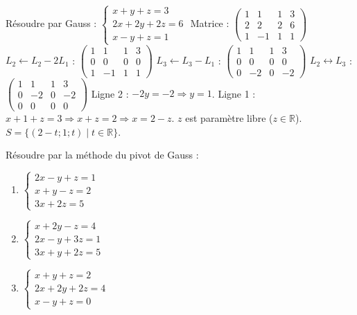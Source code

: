 \documentclass[11pt]{article}
\begin{document}
\begin{exoresolu}
Résoudre par Gauss :
$\begin{cases}
x + y + z = 3 \\
2x + 2y + 2z = 6 \\
x - y + z = 1
\end{cases}$
\tcblower
Matrice :
$\left( \begin{array}{ccc|c} 1 & 1 & 1 & 3 \\ 2 & 2 & 2 & 6 \\ 1 & -1 & 1 & 1 \end{array} \right)$
$L_2 \leftarrow L_2 - 2L_1$ : $\left( \begin{array}{ccc|c} 1 & 1 & 1 & 3 \\ 0 & 0 & 0 & 0 \\ 1 & -1 & 1 & 1 \end{array} \right)$
$L_3 \leftarrow L_3 - L_1$ : $\left( \begin{array}{ccc|c} 1 & 1 & 1 & 3 \\ 0 & 0 & 0 & 0 \\ 0 & -2 & 0 & -2 \end{array} \right)$
$L_2 \leftrightarrow L_3$ : $\left( \begin{array}{ccc|c} 1 & 1 & 1 & 3 \\ 0 & -2 & 0 & -2 \\ 0 & 0 & 0 & 0 \end{array} \right)$
Ligne 2 : $-2y = -2 \Rightarrow y = 1$.
Ligne 1 : $x + 1 + z = 3 \Rightarrow x + z = 2 \Rightarrow x = 2 - z$.
$z$ est paramètre libre ($z \in \mathbb{R}$).
$S = \{(2-t; 1; t) \mid t \in \mathbb{R}\}$.
\end{exoresolu}

\begin{exercice}
Résoudre par la méthode du pivot de Gauss :
\begin{enumerate}
  \item $\begin{cases} 2x - y + z = 1 \\ x + y - z = 2 \\ 3x + 2z = 5 \end{cases}$
  \item $\begin{cases} x + 2y - z = 4 \\ 2x - y + 3z = 1 \\ 3x + y + 2z = 5 \end{cases}$
  \item $\begin{cases} x + y + z = 2 \\ 2x + 2y + 2z = 4 \\ x - y + z = 0 \end{cases}$
\end{enumerate}
\end{exercice}
\end{document}
